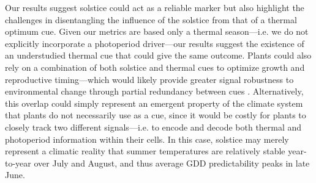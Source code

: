 \documentclass[11pt,letter]{article}
\begin{document}
Our results suggest solstice could act as a reliable marker but also highlight the challenges in disentangling the influence of the solstice from that of a thermal optimum cue. %
Given our metrics are based only a thermal season---i.e. we do not explicitly incorporate a photoperiod driver---our results suggest the existence of an understudied thermal cue that could give the same outcome.
Plants could also rely on a combination of both solstice and thermal cues to optimize growth and reproductive timing---which would likely provide greater signal robustness to environmental change through partial redundancy between cues \citep{Bonamour2019}.
Alternatively, this overlap could simply represent an emergent property of the climate system that plants do not necessarily use as a cue, since it would be costly for plants to closely track two different signals---i.e. to encode and decode both thermal and photoperiod information within their cells. In this case, solstice may merely represent a climatic reality that summer temperatures are relatively stable year-to-year over July and August, and thus  average GDD predictability peaks in late June. %
\end{document}

